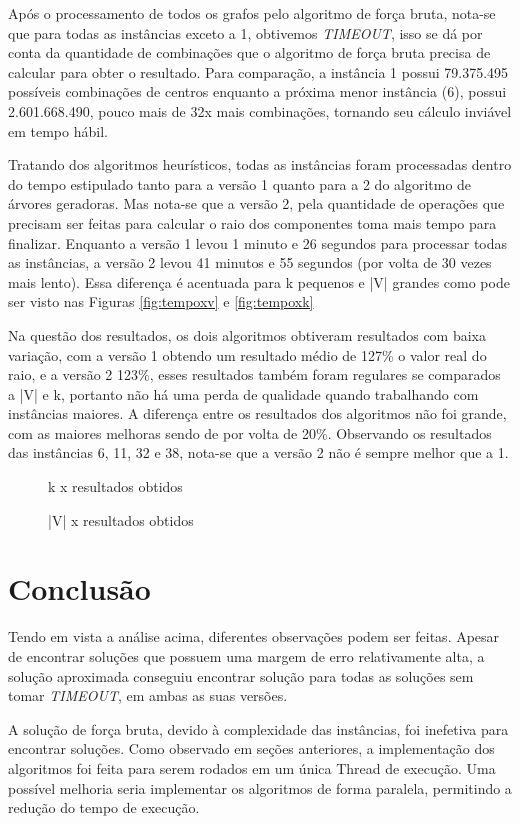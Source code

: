 Após o processamento de todos os grafos pelo algoritmo de força bruta, nota-se que para todas as instâncias exceto a 1, obtivemos \textit{TIMEOUT}, isso se dá por conta da quantidade de combinações que o algoritmo de força bruta precisa de calcular para obter o resultado. Para comparação, a instância 1 possui 79.375.495 possíveis combinações de centros enquanto a próxima menor instância (6), possui 2.601.668.490, pouco mais de 32x mais combinações, tornando seu cálculo inviável em tempo hábil.

Tratando dos algoritmos heurísticos, todas as instâncias foram processadas dentro do tempo estipulado tanto para a versão 1 quanto para a 2 do algoritmo de árvores geradoras. Mas nota-se que a versão 2, pela quantidade de operações que precisam ser feitas para calcular o raio dos componentes toma mais tempo para finalizar. Enquanto a versão 1 levou 1 minuto e 26 segundos para processar todas as instâncias, a versão 2 levou 41 minutos e 55 segundos (por volta de 30 vezes mais lento). Essa diferença é acentuada para k pequenos e |V| grandes como pode ser visto nas Figuras \ref{fig:tempoxv} e \ref{fig:tempoxk}

Na questão dos resultados, os dois algoritmos obtiveram resultados com baixa variação, com a versão 1 obtendo um resultado médio de 127\% o valor real do raio, e a versão 2 123\%, esses resultados também foram regulares se comparados a |V| e k, portanto não há uma perda de qualidade quando trabalhando com instâncias maiores. A diferença entre os resultados dos algoritmos não foi grande, com as maiores melhoras sendo de por volta de 20\%. Observando os resultados das instâncias 6, 11, 32 e 38, nota-se que a versão 2 não é sempre melhor que a 1. 

\begin{figure}
\centering
\begin{minipage}{.5\textwidth}
  \centering
    
  \caption{k x resultados obtidos}
  \label{fig:vresult} 
\end{minipage}%
\begin{minipage}{.5\textwidth}
  \centering
    
  \caption{|V| x resultados obtidos}
  \label{fig:kresult} 
\end{minipage}
\end{figure}

\section{\esp Conclusão}

Tendo em vista a análise acima, diferentes observações podem ser feitas.
Apesar de encontrar soluções que possuem uma margem de erro relativamente alta, a solução aproximada conseguiu encontrar solução para todas as soluções sem tomar \textit{TIMEOUT}, em ambas as suas versões.

A solução de força bruta, devido à complexidade das instâncias, foi inefetiva para encontrar soluções. Como observado em seções anteriores, a implementação dos algoritmos foi feita para serem rodados em um única Thread de execução. Uma possível melhoria seria implementar os algoritmos de forma paralela, permitindo a redução do tempo de execução.
